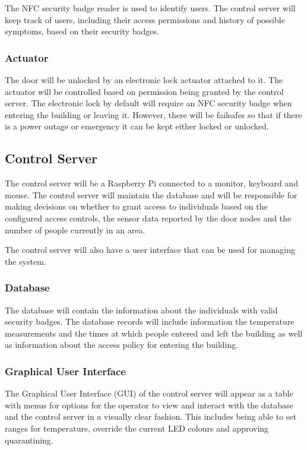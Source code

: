 The NFC security badge reader is used to identify users. The control server will
keep track of users, including their access permissions and history of possible
symptoms, based on their security badges.

\subsubsection{Actuator}
The door will be unlocked by an electronic lock actuator attached to it. The
actuator will be controlled based on permission being granted by the control
server. The electronic lock by default will require an NFC security badge when
entering the building or leaving it. However, there will be failsafes so that if
there is a power outage or emergency it can be kept either locked or unlocked.

\subsection{Control Server}
The control server will be a Raspberry Pi connected to a monitor, keyboard and
mouse. The control server will maintain the database and will be responsible for
making decisions on whether to grant access to individuals based on the
configured access controls, the sensor data reported by the door nodes and the 
number of people currently in an area. 

The control server will also have a user interface that can be used for managing
the system.

\subsubsection{Database}
The database will contain the information about the individuals with valid
security badges. The database records will include information the temperature
measurements and the times at which people entered and left the building as well
as information about the access policy for entering the building.

\subsubsection{Graphical User Interface}
The Graphical User Interface (GUI) of the control server will appear as a table
with menus for options for the operator to view and interact with the database 
and the control server in a visually clear fashion. This includes being able to
set ranges for temperature, override the current LED colours and approving
quarantining.

